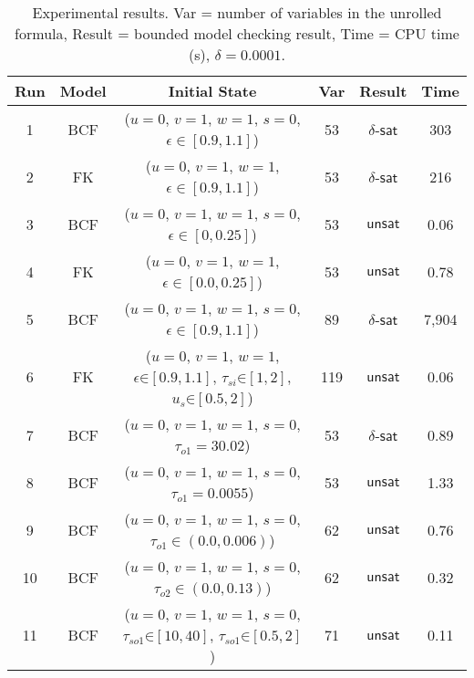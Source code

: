 {\small
\begin{table}[!th]
  \centering
  \small
  \begin{tabular}{c|c|c|c|c|c}
    \hline
    \hline
    Run & Model   & Initial State  & Var  & Result   & Time   \\
    \hline
    \hline
    1 & BCF & ($u = 0$, $v = 1$, $w = 1$, $s = 0$, $\epsilon \in [0.9,1.1]$) & 53  & $\delta$-$\mathsf{sat}$  & 303 \\
    2 & FK & ($u = 0$, $v = 1$, $w = 1$, $\epsilon \in [0.9,1.1]$)  & 53 & $\delta$-$\mathsf{sat}$ & 216 \\
    3 & BCF & ($u = 0$, $v = 1$, $w = 1$, $s = 0$, $\epsilon \in [0,0.25]$) & 53  & $\mathsf{unsat}$  & 0.06 \\
    4 & FK & ($u = 0$, $v = 1$, $w = 1$, $\epsilon \in [0.0,0.25]$)  & 53 & $\mathsf{unsat}$ & 0.78 \\
    5 & BCF & ($u = 0$, $v = 1$, $w = 1$, $s = 0$, $\epsilon \in [0.9,1.1]$)  & 89  & $\delta$-$\mathsf{sat}$  & 7,904 \\
    6 & FK & ($u = 0$, $v = 1$, $w = 1$, $\epsilon \mathord{\in} [0.9,1.1]$, $\tau_{si} \mathord{\in} [1,2]$, $u_{s} \mathord{\in} [0.5,2]$)  & 119 & $\mathsf{unsat}$ & 0.06 \\   
    7 & BCF & ($u = 0$, $v = 1$, $w = 1$, $s = 0$, $\tau_{o1} = 30.02$) & 53  & $\delta$-$\mathsf{sat}$  & 0.89 \\        
    8 & BCF & ($u = 0$, $v = 1$, $w = 1$, $s = 0$, $\tau_{o1} = 0.0055$) & 53  & $\mathsf{unsat}$  & 1.33 \\        
    9 & BCF & ($u = 0$, $v = 1$, $w = 1$, $s = 0$, $\tau_{o1} \in (0.0, 0.006)$) & 62  & $\mathsf{unsat}$  & 0.76 \\        
    10 & BCF & ($u = 0$, $v = 1$, $w = 1$, $s = 0$, $\tau_{o2} \in (0.0, 0.13)$)  & 62  & $\mathsf{unsat}$  & 0.32 \\     
    11 & BCF & ($u = 0$, $v = 1$, $w = 1$, $s = 0$, $\tau_{so1} \mathord{\in} [10, 40]$, $\tau_{so1}\mathord{\in} [0.5, 2]$) & 71  & $\mathsf{unsat}$  & 0.11 \\   
    \hline
    \hline
  \end{tabular}
  \caption{\small Experimental results.
    Var = number of variables in the unrolled formula,
    Result = bounded model checking result,
    Time = CPU time (s),
    $\delta=0.0001$.
}\label{tbl:exp}
\end{table}
}


